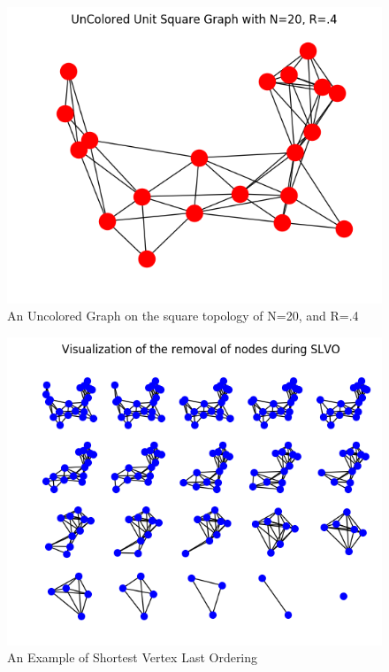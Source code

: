 \documentclass{article}
\begin{document}
    \begin{figure}
      \centering
      \label{uncolored_graph}
      \includegraphics[width=1 \textwidth]{walkthrough/uncolored}
      \caption{An Uncolored Graph on the square topology of N=20, and R=.4}
    \end{figure}

    \begin{figure}
      \centering
      \label{ordering_graph}
      \includegraphics[width=1 \textwidth]{walkthrough/ordering}
      \caption{An Example of Shortest Vertex Last Ordering}
    \end{figure}
\end{document}
